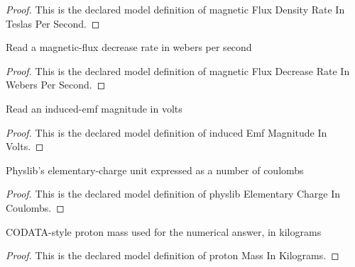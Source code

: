 \begin{proof}
  This is the declared model definition of magnetic Flux Density Rate In Teslas Per Second.
\end{proof}
\begin{definition}
  \label{def:physics:phyx-mini-0927:phyxminiproblems-problemphyxmini0927-magneticfluxdecreaserateinweberspersecond}
  Read a magnetic-flux decrease rate in webers per second
\end{definition}
\begin{proof}
  This is the declared model definition of magnetic Flux Decrease Rate In Webers Per Second.
\end{proof}
\begin{definition}
  \label{def:physics:phyx-mini-0927:phyxminiproblems-problemphyxmini0927-inducedemfmagnitudeinvolts}
  Read an induced-emf magnitude in volts
\end{definition}
\begin{proof}
  This is the declared model definition of induced Emf Magnitude In Volts.
\end{proof}
\begin{definition}
  \label{def:physics:phyx-mini-0927:phyxminiproblems-problemphyxmini0927-physlibelementarychargeincoulombs}
  Physlib's elementary-charge unit expressed as a number of coulombs
\end{definition}
\begin{proof}
  This is the declared model definition of physlib Elementary Charge In Coulombs.
\end{proof}
\begin{definition}
  \label{def:physics:phyx-mini-0927:phyxminiproblems-problemphyxmini0927-protonmassinkilograms}
  CODATA-style proton mass used for the numerical answer, in kilograms
\end{definition}
\begin{proof}
  This is the declared model definition of proton Mass In Kilograms.
\end{proof}
